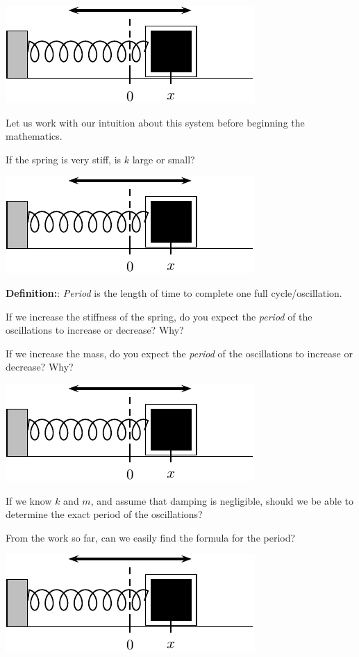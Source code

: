 \newpage
\begin{center}
\includegraphics[width=0.35\linewidth]{graphics/notes_08_block}
\end{center}
Let us work with our intuition about this system before beginning the mathematics.

\problem If the spring is very stiff, is $k$ large or small?  \vfill

\newpage 
\begin{center}
\includegraphics[width=0.35\linewidth]{graphics/notes_08_block}
\end{center}

{\bf Definition:}: {\em Period} is the length of time to
complete one full cycle/oscillation.  \vspace{0.2in}

\problem If we increase the stiffness of the spring, do you expect the
{\em period} of the oscillations to increase or decrease?  Why?

\vfill

If we increase the mass, do you expect
the \emph{period} of the oscillations to increase or decrease? Why?

\vfill

\newpage
\begin{center}
\includegraphics[width=0.35\linewidth]{graphics/notes_08_block}
\end{center}

\problem If we know $k$ and $m$, and assume that damping is
negligible, should we be able to determine the exact period of the
oscillations?  \vfill


\vfill

From the work so far, can we easily find the formula for the period?

\vfill

\newpage
\begin{center}
\includegraphics[width=0.35\linewidth]{graphics/notes_08_block}
\end{center}

